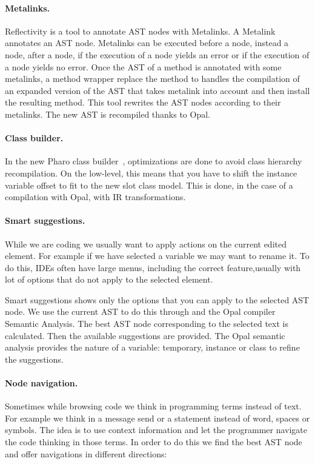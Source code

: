 \documentclass[preprint,10pt]{sigplanconf}
\begin{document}
\paragraph{Metalinks.} Reflectivity is a tool to annotate AST nodes with Metalinks. A Metalink annotates an AST node. Metalinks can be executed before a node, instead a node, after a node, if the execution of a node yields an error or if the execution of a node yields no error. Once the AST of a method is annotated with some metalinks, a method wrapper replace the method to handles the compilation of an expanded version of the AST that takes metalink into account and then install the resulting method. This tool rewrites the AST nodes according to their metalinks. The new AST is recompiled thanks to Opal.

\paragraph{Class builder.} In the new Pharo class builder~\cite{Verw11a, Verw11b}, optimizations are done to avoid class hierarchy recompilation.  On the low-level, this means that you have to shift the instance variable offset to fit to the new slot class model. This is done, in the case of a compilation with Opal, with IR transformations.

\paragraph{Smart suggestions.} While we are coding we usually want to apply actions on the current edited element. For example if we have selected a variable we may want to rename it. To do this, IDEs often have large menus, including the correct feature,usually with lot of options that do not apply to the selected element. 

Smart suggestions shows only the options that you can apply to the selected AST node. We use the current AST to do this through  and the Opal compiler Semantic Analysis. The best AST node corresponding to the selected text is calculated. Then the available suggestions are provided. The Opal semantic analysis provides the nature of a variable: temporary, instance or class to refine the suggestions.

\paragraph {Node navigation.} Sometimes while browsing code we think in programming terms instead of text. For example we think in a message send or a statement instead of word, spaces or symbols. The idea is to use context information and let the programmer navigate the code thinking in those terms. In order to do this we find the best AST node and offer navigations in different directions:
\end{document}
